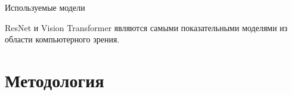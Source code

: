 \documentclass[9pt]{beamer}
\begin{document}
\begin{frame}{Используемые модели}
    \begin{figure}
        \setcounter{subfigure}{0}
        \centering
        \hskip4pt
    \end{figure}

    \begin{block}{}
        ResNet и Vision Transformer являются самыми показательными моделями из области компьютерного зрения.
    \end{block}
\end{frame}

\section{Методология}
\end{document}
